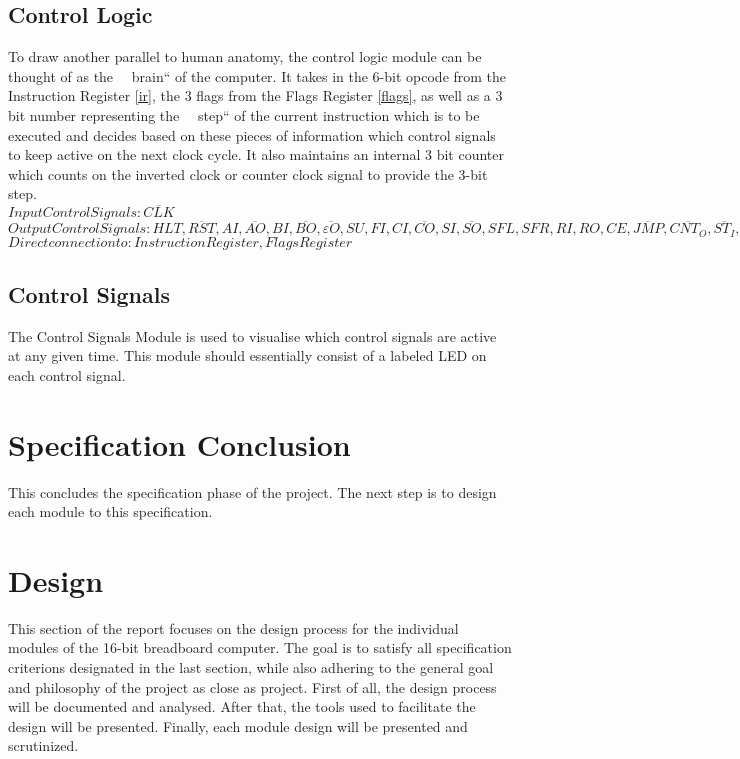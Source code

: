 \subsection{Control Logic} \label{control-logic}
To draw another parallel to human anatomy, the control logic module can be thought of as the ~~brain`` of the computer.
It takes in the 6-bit opcode from the Instruction Register \ref{ir}, the 3 flags from the Flags Register \ref{flags}, as well as
a 3 bit number representing the ~~step`` of the current instruction which is to be executed and decides based on these pieces
of information which control signals to keep active on the next clock cycle. It also maintains an internal 3 bit counter which
counts on the inverted clock or counter clock signal to provide the 3-bit step. \\
\textbf{$Input Control Signals: \overline{CLK}$}
\textbf{$Output Control Signals: HLT, \overline{RST}, AI, \overline{AO}, BI, \overline{BO}, \overline{\varepsilon O}, SU, FI, CI, \overline{CO}, SI, \overline{SO}, SFL, SFR, RI, RO, CE, \overline{JMP}, \overline{CNT_O}, \overline{ST_I}, \overline{ST_D}, \overline{ST_J}, \overline{ST_O}, OUT, \overline{E}, R/\overline{W}, MI, II, \overline{IO}$}
\textbf{$Direct connection to: Instruction Register, Flags Register$}


\subsection{Control Signals} \label{control-sigs}
The Control Signals Module is used to visualise which control signals are active at any given time. This module should
essentially consist of a labeled LED on each control signal.

\section{Specification Conclusion}
This concludes the specification phase of the project. The next step is to design each module to this specification.

\section{Design}
This section of the report focuses on the design process for the individual modules of the 16-bit breadboard computer.
The goal is to satisfy all specification criterions designated in the last section, while also adhering to the general goal
and philosophy of the project as close as project. First of all, the design process will be documented and analysed. After that,
the tools used to facilitate the design will be presented. Finally, each module design will be presented and scrutinized.

